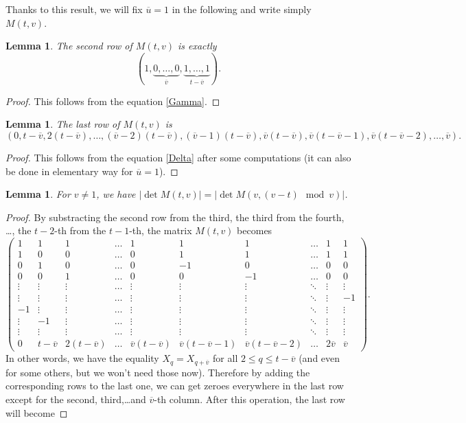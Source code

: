 \documentclass[12pt,a4paper]{article}
\newtheorem{lemma}[theorem]{Lemma}
\newcommand{\uo}{\overline{u}}
\newcommand{\vo}{\overline{v}}
\begin{document}
Thanks to this result, we will fix $\uo=1$ in the following and write simply $M(t,v)$.

\begin{lemma}
The second row of $M(t,v)$
is exactly $$(1,\underbrace{0,\dots,0}_{\vo},\underbrace{1,\dots,1}_{t-\vo}).$$
\end{lemma}
\begin{proof}
This follows from the equation \eqref{Gamma}.
\end{proof}

\begin{lemma}
The last row of $M(t,v)$ is $$(0,t-\vo,2(t-\vo),\dots,(\vo-2)(t-\vo),(\vo-1)(t-\vo),\vo(t-\vo),\vo(t-\vo-1),\vo(t-\vo-2),\dots,\vo).$$
\end{lemma}
\begin{proof}
This follows from the equation \eqref{Delta} after some computations (it can also be done in elementary way for $\uo=1$).
\end{proof}

\begin{lemma}\label{euclid}
For $v\neq1$, we have $|\det M(t,v)|=|\det M(v, (v-t)\mod v)|$.
\end{lemma}
\begin{proof}
By substracting the second row from the third, the third from the fourth, \dots, the $t-2$-th from the $t-1$-th, the matrix $M(t,v)$ becomes
$$
\begin{pmatrix}
 1 & 1 & 1 & \dots & 1& 1&1& \dots & 1 & 1\\ 
 1 & 0 & 0 & \dots & 0 & 1&1&\dots & 1 & 1\\ 
 0 & 1 & 0 & \dots& 0 & -1&0&\dots & 0 & 0\\ 
 0 & 0 & 1 & \dots & 0 &0&-1& \dots & 0 & 0\\ 
 \vdots & \vdots & \vdots & \dots& \vdots & \vdots &\vdots &\ddots& \vdots & \vdots\\ 
 \vdots & \vdots & \vdots & \dots& \vdots & \vdots &\vdots &\ddots& \vdots &-1\\ 
-1 & \vdots & \vdots & \dots& \vdots & \vdots &\vdots &\ddots& \vdots &\vdots\\ 
\vdots & -1 & \vdots & \dots& \vdots & \vdots &\vdots &\ddots& \vdots &\vdots\\ 
\vdots & \vdots & \vdots & \dots& \vdots & \vdots &\vdots &\ddots& \vdots & \vdots\\ 
 0 & t-\vo &2(t-\vo) & \dots& \vo(t-\vo) &\vo(t-\vo-1)& \vo(t-\vo-2)  &\dots& 2\vo & \vo
\end{pmatrix}.
$$
In other words, we have the equality $X_q=X_{q+\vo}$ for all $2\leq q\leq t-\vo$ (and even for some others, but we won't need those now). Therefore by adding the corresponding rows to the last one, we can get zeroes everywhere in the last row except for the second, third,\dots and $\vo$-th column. After this operation, the last row will become
\end{proof}
\end{document}
